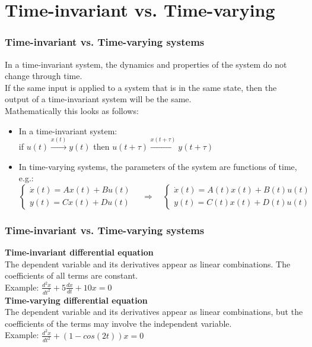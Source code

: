 \section{Time-invariant vs. Time-varying} 

\begin{frame}
	\frametitle{Time-invariant vs. Time-varying systems}
	In a time-invariant system, the dynamics and properties of the system do not change through time.\\
	If the same input is applied to a system that is in the same state, then the output of a time-invariant system will be the same.\\
	\bigskip
	Mathematically this looks as follows:\\
	\begin{itemize}
		\item In a time-invariant system:\\
		if $u(t) \xrightarrow{x(t)} y(t)$ then $u(t+\tau) \xrightarrow{x(t+\tau)} y(t+\tau)$
		\medskip
		\item In time-varying systems, the parameters of the system are functions of time, e.g.:\\
		\vspace{-2ex}
		\begin{equation*}
			\begin{cases}
				\dot{x}(t) = Ax(t) + Bu(t)\\
				y(t) = Cx(t) + Du(t)
			\end{cases} \quad
			\Rightarrow \quad
			\begin{cases}
				\dot{x}(t) = A(t)x(t) + B(t)u(t)\\
				y(t) = C(t)x(t) + D(t)u(t)
			\end{cases}
		\end{equation*}
	\end{itemize}
\end{frame}

\begin{frame}
	\frametitle{Time-invariant vs. Time-varying systems}
	\textbf{Time-invariant differential equation}\\
	\medskip
	The dependent variable and its derivatives appear as linear combinations. The coefficients of all terms are constant.\\
	Example: $\frac{d^{2}x}{dt^{2}} + 5\frac{dx}{dt} + 10x=0$\\
	\bigskip
	\bigskip
	\textbf{Time-varying differential equation}\\
	\medskip
	The dependent variable and its derivatives appear as linear combinations, but the coefficients of the terms may involve the independent variable.\\
	Example: $\frac{d^{2}x}{dt^{2}} + (1-cos(2t))x = 0$
\end{frame}

